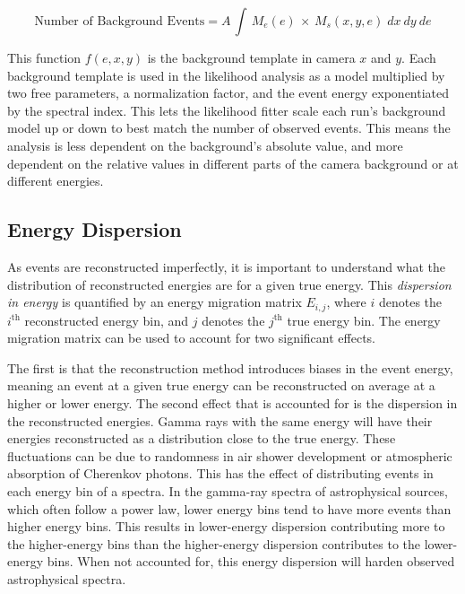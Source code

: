     \begin{equation}\label{eqn:background_template_function}
      \textrm{Number of Background Events} = A \, \int \, M_{e} \left ( e \right ) \, \times \, M_{s} \left ( x, y, e \right ) \; dx \: dy \: de
    \end{equation}

    This function $f(e,x,y)$ is the background template in camera $x$ and $y$.
    Each background template is used in the likelihood analysis as a model multiplied by two free parameters, a normalization factor, and the event energy exponentiated by the spectral index.
    This lets the likelihood fitter scale each run's background model up or down to best match the number of observed events.
    This means the analysis is less dependent on the background's absolute value, and more dependent on the relative values in different parts of the camera background or at different energies.
  
  \FloatBarrier

  \subsection{Energy Dispersion}\label{subsec:edisp}
    As events are reconstructed imperfectly, it is important to understand what the distribution of reconstructed energies are for a given true energy.
    This \textit{dispersion in energy} is quantified by an energy migration matrix $E_{i,j}$, where $i$ denotes the $i^{\text{th}}$ reconstructed energy bin, and $j$ denotes the $j^{\text{th}}$ true energy bin.
    The energy migration matrix can be used to account for two significant effects.
    
    The first is that the reconstruction method introduces biases in the event energy, meaning an event at a given true energy can be reconstructed on average at a higher or lower energy.
    The second effect that is accounted for is the dispersion in the reconstructed energies.
    Gamma rays with the same energy will have their energies reconstructed as a distribution close to the true energy.
    These fluctuations can be due to randomness in air shower development or atmospheric absorption of Cherenkov photons.
    This has the effect of distributing events in each energy bin of a spectra.
    In the gamma-ray spectra of astrophysical sources, which often follow a power law, lower energy bins tend to have more events than higher energy bins.
    This results in lower-energy dispersion contributing more to the higher-energy bins than the higher-energy dispersion contributes to the lower-energy bins.
    When not accounted for, this energy dispersion will harden observed astrophysical spectra.
    
